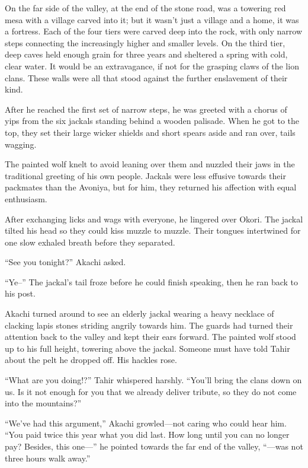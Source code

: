 On the far side of the valley, at the end of the stone road, was a towering red mesa with a village carved into it; but it wasn't just a village and a home, it was a fortress. Each of the four tiers were carved deep into the rock, with only narrow steps connecting the increasingly higher and smaller levels. On the third tier, deep caves held enough grain for three years and sheltered a spring with cold, clear water. It would be an extravagance, if not for the grasping claws of the lion clans. These walls were all that stood against the further enslavement of their kind.

After he reached the first set of narrow steps, he was greeted with a chorus of yips from the six jackals standing behind a wooden palisade. When he got to the top, they set their large wicker shields and short spears aside and ran over, tails wagging.

The painted wolf knelt to avoid leaning over them and nuzzled their jaws in the traditional greeting of his own people. Jackals were less effusive towards their packmates than the Avoniya, but for him, they returned his affection with equal enthusiasm.

After exchanging licks and wags with everyone, he lingered over Okori. The jackal tilted his head so they could kiss muzzle to muzzle. Their tongues intertwined for one slow exhaled breath before they separated.

``See you tonight?'' Akachi asked.

``Ye--'' The jackal's tail froze before he could finish speaking, then he ran back to his post.

Akachi turned around to see an elderly jackal wearing a heavy necklace of clacking lapis stones striding angrily towards him. The guards had turned their attention back to the valley and kept their ears forward. The painted wolf stood up to his full height, towering above the jackal. Someone must have told Tahir about the pelt he dropped off. His hackles rose.

``What are you doing!?'' Tahir whispered harshly. ``You'll bring the clans down on us. Is it not enough for you that we already deliver tribute, so they do not come into the mountains?''

``We've had this argument,'' Akachi growled---not caring who could hear him. ``You paid twice this year what you did last. How long until you can no longer pay? Besides, this one---'' he pointed towards the far end of the valley, ``---was not three hours walk away.''


